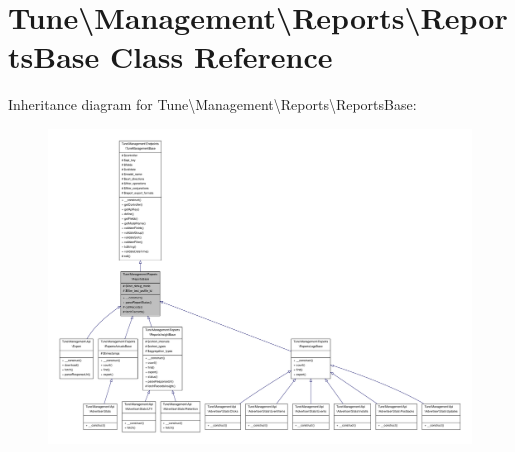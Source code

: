 \hypertarget{classTune_1_1Management_1_1Reports_1_1ReportsBase}{\section{Tune\textbackslash{}Management\textbackslash{}Reports\textbackslash{}Reports\-Base Class Reference}
\label{classTune_1_1Management_1_1Reports_1_1ReportsBase}
}


Inheritance diagram for Tune\textbackslash{}Management\textbackslash{}Reports\textbackslash{}Reports\-Base\-:
\nopagebreak
\begin{figure}[H]
\begin{center}
\leavevmode
\includegraphics[width=350pt]{classTune_1_1Management_1_1Reports_1_1ReportsBase__inherit__graph}
\end{center}
\end{figure}


